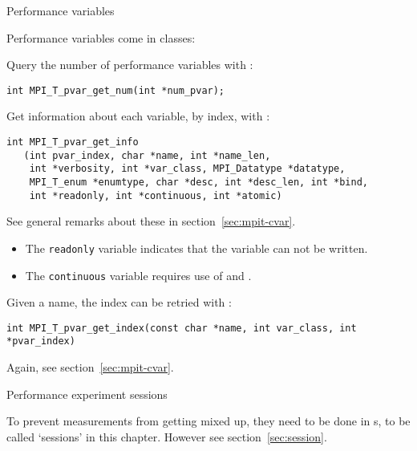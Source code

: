 \begin{mpifour}

 {Performance variables}

\begin{raggedlist}
  Performance variables come in classes:
\end{raggedlist}

Query the number of performance variables with :
\begin{lstlisting}
int MPI_T_pvar_get_num(int *num_pvar);
\end{lstlisting}
Get information about each variable, by index, with :
\begin{lstlisting}
int MPI_T_pvar_get_info
   (int pvar_index, char *name, int *name_len,
    int *verbosity, int *var_class, MPI_Datatype *datatype,
    MPI_T_enum *enumtype, char *desc, int *desc_len, int *bind,
    int *readonly, int *continuous, int *atomic)
\end{lstlisting}
See general remarks about these in section~\ref{sec:mpit-cvar}.
\begin{itemize}
\item The \lstinline{readonly} variable indicates that the variable can not be written.
\item The \lstinline{continuous} variable requires use of
   and .
\end{itemize}

Given a name, the index can be retried with :
\begin{lstlisting}
int MPI_T_pvar_get_index(const char *name, int var_class, int *pvar_index)
\end{lstlisting}
Again, see section~\ref{sec:mpit-cvar}.

 {Performance experiment sessions}

To prevent measurements from getting mixed up, they need to be done in
s,
to be called `sessions' in this chapter.
However see section~\ref{sec:session}.


\end{mpifour}
